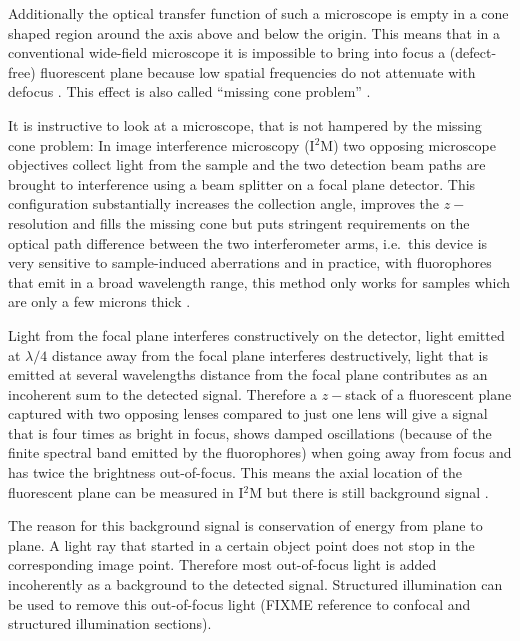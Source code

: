 Additionally the optical transfer function of such a microscope is
empty in a cone shaped region around the axis above and below the
origin.  This means that in a conventional wide-field microscope it is
impossible to bring into focus a (defect-free) fluorescent plane
because low spatial frequencies do not attenuate with defocus
\citep{Neil1997}. This effect is also called ``missing cone problem''
\citep{Streibl1984}.

It is instructive to look at a microscope, that is not hampered by the
missing cone problem: In image interference microscopy (I${}^2$M) two
opposing microscope objectives collect light from the sample and the
two detection beam paths are brought to interference using a beam
splitter on a focal plane detector. This configuration substantially
increases the collection angle, improves the $z-$resolution and fills
the missing cone but puts stringent requirements on the optical path
difference between the two interferometer arms, i.e.\ this device is
very sensitive to sample-induced aberrations and in practice, with
fluorophores that emit in a broad wavelength range, this method only
works for samples which are only a few microns thick
\citep{Gustafsson1999}.



Light from the focal plane interferes constructively on the detector,
light emitted at $\lambda/4$ distance away from the focal plane
interferes destructively, light that is emitted at several wavelengths
distance from the focal plane contributes as an incoherent sum to the
detected signal. Therefore a $z-$stack of a fluorescent plane captured
with two opposing lenses compared to just one lens will give a signal
that is four times as bright in focus, shows damped oscillations
(because of the finite spectral band emitted by the fluorophores) when
going away from focus and has twice the brightness out-of-focus. This
means the axial location of the fluorescent plane can be measured in
I${}^2$M but there is still background signal \citep{Gustafsson1995}.

The reason for this background signal is conservation of energy from
plane to plane. A light ray that started in a certain object point
does not stop in the corresponding image point. Therefore most
out-of-focus light is added incoherently as a background to the
detected signal. Structured illumination can be used to remove this
out-of-focus light (FIXME reference to confocal and structured
illumination sections).


